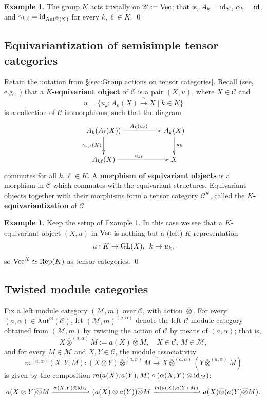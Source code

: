 \documentclass{amsart}
\theoremstyle{definition}
\newtheorem{example}[theorem]{Example}
\newcommand{\id}{{\rm id}}
\newcommand{\Rep}{{\rm Rep}}
\newcommand{\Vect}{{\rm Vec}}
\newcommand{\C}{\mathscr{C}}
\newcommand{\M}{\mathscr{M}}
\newcommand{\ot}{\otimes}
\numberwithin{equation}{section}
\begin{document}
\begin{example}\label{eqvec}
The group $K$ acts trivially on $\C:=\Vect $; that is, $A_k=\id_{\C}$, $\alpha_k=\id$, and $\gamma_{k,\ell}=\id_{{\rm Aut}^\ot(\C)}$ for every $k,\ell\in K$. \qed
\end{example}

\subsection{Equivariantization of semisimple tensor categories}\label{sec:Equivariantization of tensor categories}
Retain the notation from \S\ref{sec:Group actions on tensor categories}. Recall (see, e.g., \cite[Definition 2.7.2]{EGNO}) that a {\bf $K$-equivariant object} of $\C$ is a
pair $(X,u)$, where $X\in \C$ and 
$$u=\{u_k: A_k(X)\xrightarrow{\cong} X\mid k\in K\}$$ 
is a collection of $\C$-isomorphisms, such that the diagram
\begin{equation}
\label{equivariantX}
\xymatrix{A_k(A_{\ell}(X))\ar[rr]^{A_k(u_{\ell})} \ar[d]_{\gamma_{k,\ell}(X)
}&&A_k(X)\ar[d]^{u_k}\\ A_{k\ell}(X)\ar[rr]^{u_{k\ell}}&&X}
\end{equation}
commutes for all $k,\ell\in K$.
A {\bf morphism of equivariant objects} is a morphism in $\C$ which commutes with the equivariant structures. Equivariant objects together with their morphisms form a tensor category $\C^K$, called the {\bf $K$-equivariantization} of $\C$.

\begin{example}\label{eqvec1}
Keep the setup of Example \ref{eqvec}. In this case we see that a $K$-equivariant object $(X,u)$ in $\Vect$ is nothing but a (left) $K$-representation 
$$u:K\to {\rm GL}(X),\,\,\,k\mapsto u_k,$$ 
so $\Vect ^K\simeq \Rep(K)$ as tensor categories. \qed 
\end{example}

\subsection{Twisted module categories}\label{sec:Twisted module categories} 
Fix a left module category $(\M,m)$ over $\C$, with action $\overline{\ot}$. For every $(a,\alpha)\in \text{Aut}^\ot(\C)$, let $(\M,m)^{(a,\alpha)}$ denote the left $\C$-module category obtained from $(\M,m)$ by twisting the action of $\C$ by means of $(a,\alpha)$; that is,  
\begin{equation}\label{twistedM}
X\overline{\ot}^{(a,\alpha)} M:= a(X)\overline{\ot} M,\quad X\in\C,\,M\in \M,
\end{equation}
and for every $M\in \M$ and $X,Y\in \C$, the module associativity 
\begin{equation}\label{twistedmodstrM}
m^{(a,\alpha)}(X,Y,M):(X\ot Y)\overline{\ot}^{(a,\alpha)} M\xrightarrow{\cong}X\overline{\ot}^{(a,\alpha)}(Y\overline{\ot}^{(a,\alpha)} M)
\end{equation}
is given by the composition $m(a(X),a(Y),M)\circ (\alpha(X,Y)\ot \id_{M})$:
$$a(X\ot Y)\overline{\ot} M\xrightarrow{\alpha(X,Y)\ot \id_{M}}(a(X)\ot a(Y))\overline{\ot} M \xrightarrow{m(a(X),a(Y),M)}a(X)\overline{\ot}(a(Y)\overline{\ot}M).$$
\end{document}
